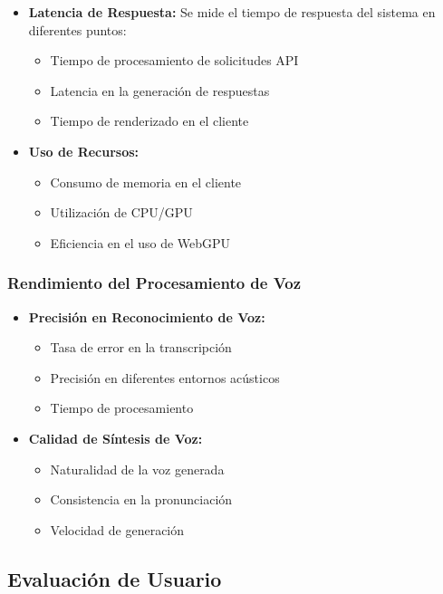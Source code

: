 \begin{itemize}
    \item \textbf{Latencia de Respuesta:} Se mide el tiempo de respuesta del sistema en diferentes puntos:
    \begin{itemize}
        \item Tiempo de procesamiento de solicitudes API
        \item Latencia en la generación de respuestas
        \item Tiempo de renderizado en el cliente
    \end{itemize}

    \item \textbf{Uso de Recursos:}
    \begin{itemize}
        \item Consumo de memoria en el cliente
        \item Utilización de CPU/GPU
        \item Eficiencia en el uso de WebGPU
    \end{itemize}
\end{itemize}

\subsubsection{Rendimiento del Procesamiento de Voz}

\begin{itemize}
    \item \textbf{Precisión en Reconocimiento de Voz:}
    \begin{itemize}
        \item Tasa de error en la transcripción
        \item Precisión en diferentes entornos acústicos
        \item Tiempo de procesamiento
    \end{itemize}

    \item \textbf{Calidad de Síntesis de Voz:}
    \begin{itemize}
        \item Naturalidad de la voz generada
        \item Consistencia en la pronunciación
        \item Velocidad de generación
    \end{itemize}
\end{itemize}

\subsection{Evaluación de Usuario}
\label{evaluacion-usuario}

